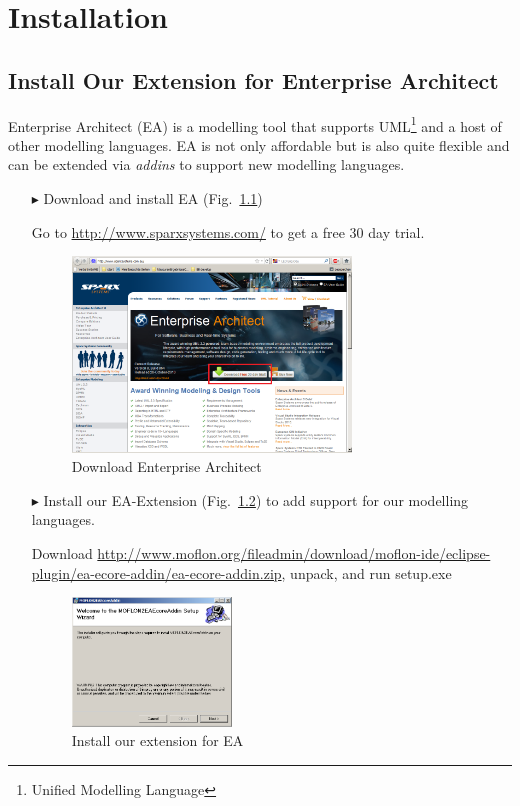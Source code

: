\chapter{Installation}
\label{chap:installation}

\section{Install Our Extension for Enterprise Architect}
Enterprise Architect (EA) is a modelling tool that supports UML\footnote{Unified Modelling Language} and a host of other modelling languages.
EA is not only affordable but is also quite flexible and can be extended via \emph{addins} to support new modelling languages.
\vspace{-0.1cm}
\begin{enumerate}
\item[$\blacktriangleright$] Download and install EA
(Fig.~\ref{fig_enterpriseArchitextHomepage})
\item[] Go to \url{http://www.sparxsystems.com/} to get a free 30 day trial.
\begin{figure}[htbp]
	\centering
  \includegraphics[width=0.7\textwidth]{pics/installationAndSetup/ea_download.png}
	\caption{Download Enterprise Architect}
	\label{fig_enterpriseArchitextHomepage}
\end{figure} 

\item[$\blacktriangleright$] Install our EA-Extension (Fig.~\ref{fig_eaPluginWizard}) to add support for our modelling languages.
\item[] Download \url{http://www.moflon.org/fileadmin/download/moflon-ide/eclipse-plugin/ea-ecore-addin/ea-ecore-addin.zip}, unpack, and run setup.exe
\begin{figure}[htbp]
	\centering
  \includegraphics[width=0.4\textwidth]{pics/installationAndSetup/eaplugin_install.png}
	\caption{Install our extension for EA}
	\label{fig_eaPluginWizard}
\end{figure}
\end{enumerate}
\vspace{-1cm}
 

